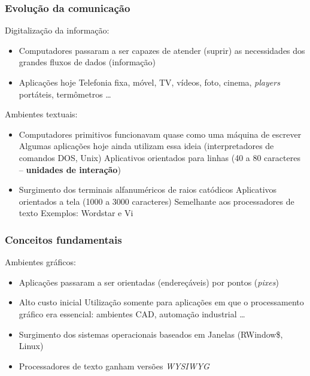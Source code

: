 \documentclass[xcolor]{beamer}
\begin{document}
\begin{frame}
    \frametitle{Evolução da comunicação}

    Digitalização da informação:

    \begin{itemize}
        \item Computadores passaram a ser capazes de atender (suprir) as
necessidades dos grandes fluxos de dados (informação)
        \item Aplicações hoje \implica Telefonia fixa, móvel, TV, vídeos, foto,
cinema, {\it players} portáteis, termômetros \ldots
    \end{itemize}

    Ambientes textuais:

    \begin{itemize}
        \item Computadores primitivos funcionavam quase como uma máquina de
escrever \implica Algumas aplicações hoje ainda utilizam essa ideia
(interpretadores de comandos DOS, Unix) \implica Aplicativos orientados para
linhas (40 a 80 caracteres -- {\bf unidades de interação})
        \item Surgimento dos terminais alfanuméricos de raios catódicos \implica
Aplicativos orientados a tela (1000 a 3000 caracteres) \implica Semelhante aos
processadores de texto \implica Exemplos: Wordstar e Vi
    \end{itemize}
\end{frame}

\begin{frame}
    \frametitle{Conceitos fundamentais}
    
    Ambientes gráficos:

    \begin{itemize}
        \item Aplicações passaram a ser orientadas (endereçáveis) por pontos
({\it pixes})
        \item Alto custo inicial \implica Utilização somente para aplicações em
que o processamento gráfico era essencial: ambientes CAD, automação industrial
\ldots
        \item Surgimento dos sistemas operacionais baseados em Janelas
(RWindow\$, Linux)
        \item Processadores de texto ganham versões {\it WYSIWYG}
    \end{itemize}
\end{frame}
\end{document}
